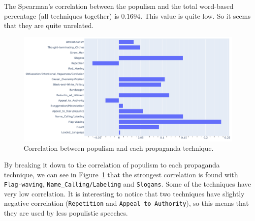 

The Spearman's correlation between the populism and the total word-based percentage (all techniques together) is $0.1694$. This value is quite low. So it seems that they are quite unrelated. %

\begin{figure}[!htbp]
    \centering
    \includegraphics[width=\linewidth]{figures/populism_propaganda_correlation.pdf}
    \caption{Correlation between populism and each propaganda technique.}
    \label{fig:populism_propaganda_correlation}
\end{figure}

By breaking it down to the correlation of populism to each propaganda technique, we can see in Figure~\ref{fig:populism_propaganda_correlation} that the strongest correlation is found with \texttt{Flag-waving}, \texttt{Name\_Calling/Labeling} and \texttt{Slogans}. Some of the techniques have very low correlation. It is interesting to notice that two techniques have slightly negative correlation (\texttt{Repetition} and \texttt{Appeal\_to\_Authority}), so this means that they are used by less populistic speeches.



